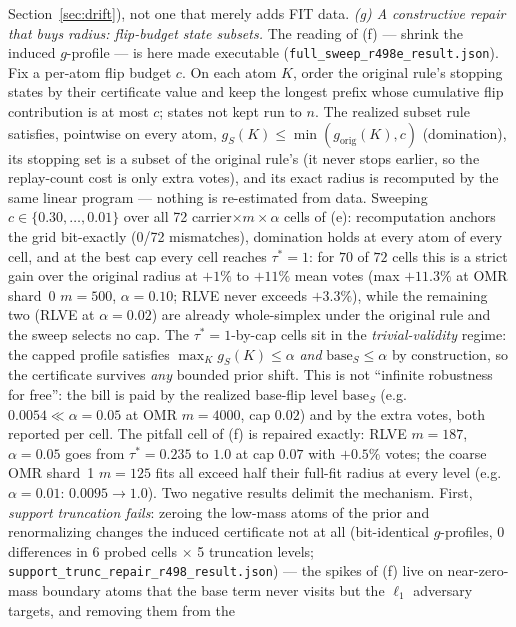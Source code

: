 \documentclass{article}
\theoremstyle{definition}
\theoremstyle{remark}
\begin{document}
Section~\ref{sec:drift}), not one that merely adds FIT data.
\emph{(g) A constructive repair that buys radius: flip-budget state
subsets.} The reading of (f) --- shrink the induced $g$-profile --- is
here made executable
(\texttt{full\_sweep\_r498e\_result.json}). Fix a per-atom flip budget
$c$. On each atom $K$, order the original rule's stopping states by
their certificate value and keep the longest prefix whose cumulative
flip contribution is at most $c$; states not kept run to $n$. The
realized subset rule satisfies, pointwise on every atom,
$g_S(K)\le\min(g_{\mathrm{orig}}(K),c)$ (domination), its stopping set
is a subset of the original rule's (it never stops earlier, so the
replay-count cost is only extra votes), and its exact radius is
recomputed by the same linear program --- nothing is re-estimated from
data. Sweeping $c\in\{0.30,\dots,0.01\}$ over all 72
carrier$\times m\times\alpha$ cells of (e): recomputation anchors the
grid bit-exactly (0/72 mismatches), domination holds at every atom of
every cell, and at the best cap every cell reaches $\tau^*=1$: for
$70$ of $72$ cells this is a strict gain over the original radius at
$+1\%$ to $+11\%$ mean votes (max $+11.3\%$ at OMR
shard~0 $m{=}500$, $\alpha{=}0.10$; RLVE never exceeds $+3.3\%$),
while the remaining two (RLVE at $\alpha{=}0.02$) are already
whole-simplex under the original rule and the sweep selects no cap.
The $\tau^*=1$-by-cap cells sit in the
\emph{trivial-validity} regime: the capped profile satisfies
$\max_K g_S(K)\le\alpha$ \emph{and} $\mathrm{base}_S\le\alpha$ by
construction, so the certificate survives \emph{any} bounded prior
shift. This is not ``infinite robustness for free'': the bill is paid
by the realized base-flip level $\mathrm{base}_S$ (e.g.\
$0.0054\ll\alpha{=}0.05$ at OMR $m{=}4000$, cap $0.02$) and by the
extra votes, both reported per cell. The pitfall cell of (f) is
repaired exactly: RLVE $m{=}187$, $\alpha{=}0.05$ goes from
$\tau^*=0.235$ to $1.0$ at cap $0.07$ with $+0.5\%$ votes; the coarse
OMR shard~1 $m{=}125$ fits all exceed half their full-fit radius at
every level (e.g.\ $\alpha{=}0.01$: $0.0095\to1.0$). Two negative
results delimit the mechanism. First, \emph{support truncation fails}:
zeroing the low-mass atoms of the prior and renormalizing changes the
induced certificate not at all (bit-identical $g$-profiles, 0
differences in 6 probed cells $\times$ 5 truncation levels;
\texttt{support\_trunc\_repair\_r498\_result.json}) --- the spikes of
(f) live on near-zero-mass boundary atoms that the base term never
visits but the $\ell_1$ adversary targets, and removing them from the
\end{document}
